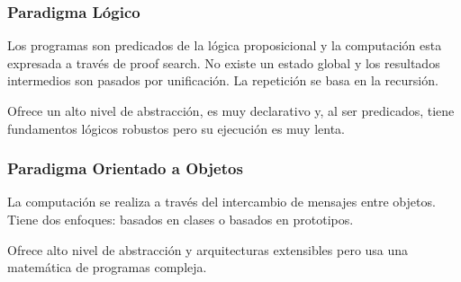 \subsubsection{Paradigma Lógico}
Los programas son predicados de la lógica proposicional y la computación esta expresada a través de proof search. No existe un estado global y los resultados intermedios son pasados por unificación. La repetición se basa en la recursión.

Ofrece un alto nivel de abstracción, es muy declarativo y, al ser predicados, tiene fundamentos lógicos robustos pero su ejecución es muy lenta.

\subsubsection{Paradigma Orientado a Objetos}
La computación se realiza a través del intercambio de mensajes entre objetos. Tiene dos enfoques: basados en clases o basados en prototipos.

Ofrece alto nivel de abstracción y arquitecturas extensibles pero usa una matemática de programas compleja.
